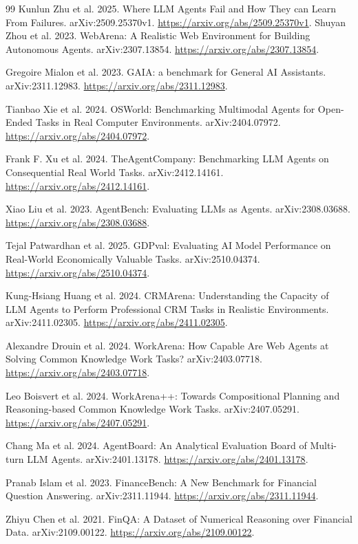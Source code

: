 \documentclass[11pt,letterpaper]{article}
\begin{document}
\begin{thebibliography}{99}
 Kunlun Zhu et al. 2025. Where LLM Agents Fail and How They can Learn From Failures. arXiv:2509.25370v1. \url{https://arxiv.org/abs/2509.25370v1}.
 Shuyan Zhou et al. 2023. WebArena: A Realistic Web Environment for Building Autonomous Agents. arXiv:2307.13854. \url{https://arxiv.org/abs/2307.13854}.

 Gregoire Mialon et al. 2023. GAIA: a benchmark for General AI Assistants. arXiv:2311.12983. \url{https://arxiv.org/abs/2311.12983}.

 Tianbao Xie et al. 2024. OSWorld: Benchmarking Multimodal Agents for Open-Ended Tasks in Real Computer Environments. arXiv:2404.07972. \url{https://arxiv.org/abs/2404.07972}.

 Frank F. Xu et al. 2024. TheAgentCompany: Benchmarking LLM Agents on Consequential Real World Tasks. arXiv:2412.14161. \url{https://arxiv.org/abs/2412.14161}.

 Xiao Liu et al. 2023. AgentBench: Evaluating LLMs as Agents. arXiv:2308.03688. \url{https://arxiv.org/abs/2308.03688}.

 Tejal Patwardhan et al. 2025. GDPval: Evaluating AI Model Performance on Real-World Economically Valuable Tasks. arXiv:2510.04374. \url{https://arxiv.org/abs/2510.04374}.

 Kung-Hsiang Huang et al. 2024. CRMArena: Understanding the Capacity of LLM Agents to Perform Professional CRM Tasks in Realistic Environments. arXiv:2411.02305. \url{https://arxiv.org/abs/2411.02305}.

 Alexandre Drouin et al. 2024. WorkArena: How Capable Are Web Agents at Solving Common Knowledge Work Tasks? arXiv:2403.07718. \url{https://arxiv.org/abs/2403.07718}.

 Leo Boisvert et al. 2024. WorkArena++: Towards Compositional Planning and Reasoning-based Common Knowledge Work Tasks. arXiv:2407.05291. \url{https://arxiv.org/abs/2407.05291}.

 Chang Ma et al. 2024. AgentBoard: An Analytical Evaluation Board of Multi-turn LLM Agents. arXiv:2401.13178. \url{https://arxiv.org/abs/2401.13178}.

 Pranab Islam et al. 2023. FinanceBench: A New Benchmark for Financial Question Answering. arXiv:2311.11944. \url{https://arxiv.org/abs/2311.11944}.

 Zhiyu Chen et al. 2021. FinQA: A Dataset of Numerical Reasoning over Financial Data. arXiv:2109.00122. \url{https://arxiv.org/abs/2109.00122}.


\end{thebibliography}
\end{document}
